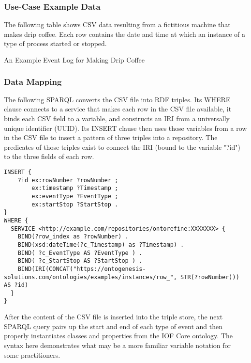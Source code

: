 \subsubsection*{Use-Case Example Data}
The following table shows CSV data resulting from a fictitious machine that makes drip coffee. Each row contains the date and time at which an instance of a type of process started or stopped.

\begin{table}[ht]
    \centering
    \caption{An Example Event Log for Making Drip Coffee}
    \label{tab:DripCoffee}
\end{table}    

\subsubsection*{Data Mapping}
The following SPARQL converts the CSV file into RDF triples. Its WHERE clause connects to a service that makes each row in the CSV file available, it binds each CSV field to a variable, and constructs an IRI from a universally unique identifier (UUID). Its INSERT clause then uses those variables from a row in the CSV file to insert a pattern of three triples into a repository. The predicates of those triples exist to connect the IRI (bound to the variable "?id") to the three fields of each row.

% 

\begin{verbatim}
INSERT {
    ?id ex:rowNumber ?rowNumber ;
        ex:timestamp ?Timestamp ;
        ex:eventType ?EventType ;
        ex:startStop ?StartStop .
}
WHERE {
  SERVICE <http://example.com/repositories/ontorefine:XXXXXXX> {
    BIND(?row_index as ?rowNumber) .
    BIND(xsd:dateTime(?c_Timestamp) as ?Timestamp) .
    BIND( ?c_EventType AS ?EventType ) .
    BIND( ?c_StartStop AS ?StartStop ) .
    BIND(IRI(CONCAT("https://ontogenesis-solutions.com/ontologies/examples/instances/row_", STR(?rowNumber))) AS ?id)
  }
}
\end{verbatim}

After the content of the CSV file is inserted into the triple store, the next SPARQL query pairs up the start and end of each type of event and then properly instantiates classes and properties from the IOF Core ontology. The syntax here demonstrates what may be a more familiar variable notation for some practitioners.

